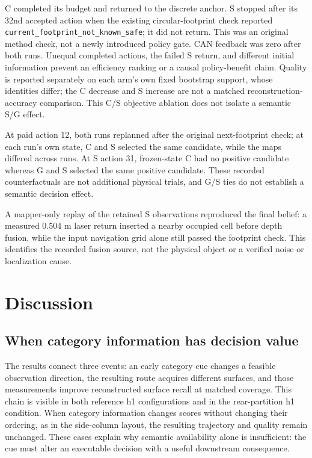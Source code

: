 \documentclass[11pt,a4paper]{article}
\providecommand{\hypertarget}[2]{#2}
\begin{document}
C completed its budget and returned to the discrete anchor. S stopped after its 32nd accepted action when the existing circular-footprint check reported \texttt{current\_footprint\_not\_known\_safe}; it did not return. This was an original method check, not a newly introduced policy gate. CAN feedback was zero after both runs. Unequal completed actions, the failed S return, and different initial information prevent an efficiency ranking or a causal policy-benefit claim. Quality is reported separately on each arm's own fixed bootstrap support, whose identities differ; the C decrease and S increase are not a matched reconstruction-accuracy comparison. This C/S objective ablation does not isolate a semantic S/G effect.

At paid action 12, both runs replanned after the original next-footprint check; at each run's own state, C and S selected the same candidate, while the maps differed across runs. At S action 31, frozen-state C had no positive candidate whereas G and S selected the same positive candidate. These recorded counterfactuals are not additional physical trials, and G/S ties do not establish a semantic decision effect.

A mapper-only replay of the retained S observations reproduced the final belief: a measured 0.504 m laser return inserted a nearby occupied cell before depth fusion, while the input navigation grid alone still passed the footprint check. This identifies the recorded fusion source, not the physical object or a verified noise or localization cause.


\hypertarget{discussion}{%
\section{Discussion}\label{discussion}}

\hypertarget{when-category-information-has-decision-value}{%
\subsection{When category information has decision value}\label{when-category-information-has-decision-value}}

The results connect three events: an early category cue changes a feasible observation direction, the resulting route acquires different surfaces, and those measurements improve reconstructed surface recall at matched coverage. This chain is visible in both reference h1 configurations and in the rear-partition h1 condition. When category information changes scores without changing their ordering, as in the side-column layout, the resulting trajectory and quality remain unchanged. These cases explain why semantic availability alone is insufficient: the cue must alter an executable decision with a useful downstream consequence.
\end{document}
